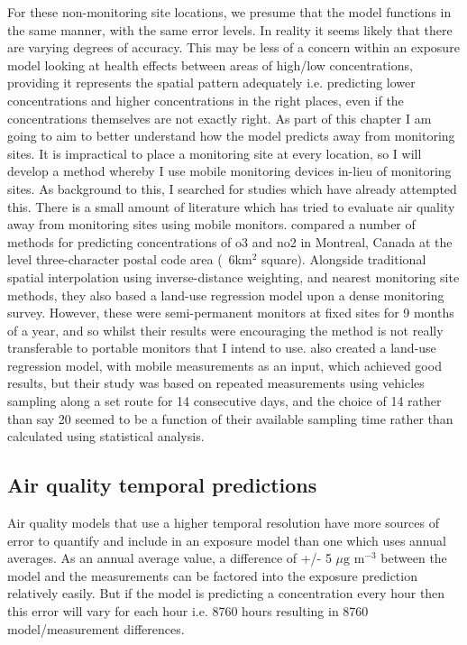 For these non-monitoring site locations, we presume that the model functions in the same manner, with the same error levels. In reality it seems likely that there are varying degrees of accuracy. This may be less of a concern within an exposure model looking at health effects between areas of high/low concentrations, providing it represents the spatial pattern adequately i.e. predicting lower concentrations and higher concentrations in the right places, even if the concentrations themselves are not exactly right. As part of this chapter I am going to aim to better understand how the model predicts away from monitoring sites. It is impractical to place a monitoring site at every location, so I will develop a method whereby I use mobile monitoring devices in-lieu of monitoring sites. As background to this, I searched for studies which have already attempted this. There is a small amount of literature which has tried to evaluate air quality away from monitoring sites using mobile monitors. \cite{Buteau2017} compared a number of methods for predicting concentrations of \gls{o3} and \gls{no2} in Montreal, Canada at the level three-character postal code area (~6km$^{2}$ square). Alongside traditional spatial interpolation using inverse-distance weighting, and nearest monitoring site methods, they also based a land-use regression model upon a dense monitoring survey. However, these were semi-permanent monitors at fixed sites for 9 months of a year, and so whilst their results were encouraging the method is not really transferable to portable monitors that I intend to use. \cite{Shi2016} also created a land-use regression model, with mobile measurements as an input, which achieved good results, but their study was based on repeated measurements using vehicles sampling along a set route for 14 consecutive days, and the choice of 14 rather than say 20 seemed to be a function of their available sampling time rather than calculated using statistical analysis.

\subsection{Air quality temporal predictions}
\label{air_quality_temporal_predictions}

Air quality models that use a higher temporal resolution have more sources of error to quantify and include in an exposure model than one which uses annual averages. As an annual average value, a difference of +/- 5 $\mu \text{g m}^{-3}$ between the model and the measurements can be factored into the exposure prediction relatively easily. But if the model is predicting a concentration every hour then this error will vary for each hour i.e. 8760 hours resulting in 8760 model/measurement differences.

